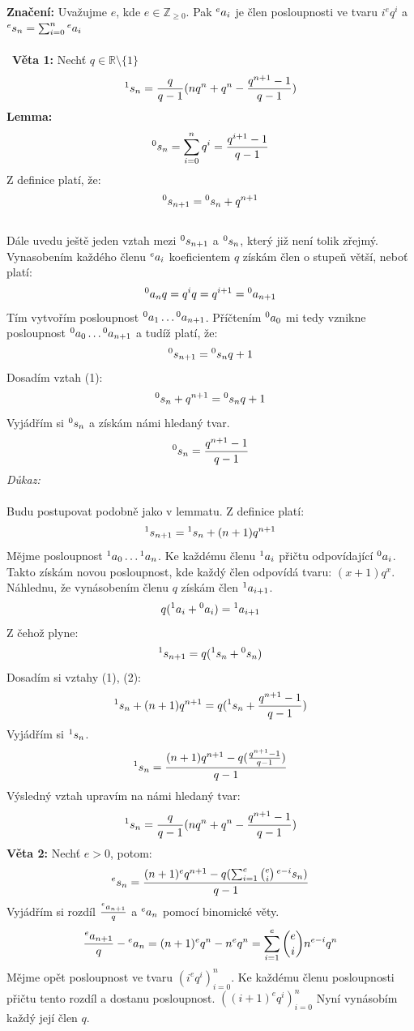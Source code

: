 \documentclass[12pt]{report}			%
\begin{document}
{\bf Značení:} Uvažujme \(e\), kde \(e \in \mathbb{Z}_{\geq 0}\). Pak \(\prescript{e}{}{a_i}\) je člen posloupnosti ve tvaru \(i^eq^i\) a  \(\prescript{e}{}{s_n} = \sum_{i = 0}^{n} \prescript{e}{}{a_i}\)\\\\\
{\bf Věta 1:} Nechť \(q \in \mathbb{R}\setminus\{1\}\) \[\prescript{1}{}{s_n} = \frac{q}{q - 1}(nq^{n}+q^{n} - \frac{q^{n+1}-1}{q-1})  \]
{\bf Lemma:} \[\prescript{0}{}{s_n} = \sum_{i=0}^{n} q^{i}=\frac{q^{i+1} - 1}{q - 1}\]
Z definice platí, že: \begin{equation} \prescript{0}{}{s_{n+1}} = \prescript{0}{}{s_{n}} + q^{n+1}\end{equation}\\Dále uvedu ještě jeden vztah mezi \(\prescript{0}{}{s_{n+1}}\) a \(\prescript{0}{}{s_{n}}\), který již není tolik zřejmý. Vynasobením každého členu \(\prescript{e}{}{a_i}\) koeficientem \(q\) získám člen o stupeň větší, neboť platí:
\[\prescript{0}{}{a_{n}}q=q^iq=q^{i+1}=\prescript{0}{}{a_{n+1}}\]Tím vytvořím posloupnost \(\prescript{0}{}{a_{1}}\dots\prescript{0}{}{a_{n+1}}\). Příčtením \(\prescript{0}{}{a_0}\) mi tedy vznikne posloupnost \(\prescript{0}{}
{a_0}\dots\prescript{0}{}{a_{n+1}}\)
a tudíž platí, že:
\[\prescript{0}{}{s_{n+1}} = \prescript{0}{}{s_{n}}q + 1\]
Dosadím vztah (1):
\[\prescript{0}{}{s_n} + q^{n+1} = \prescript{0}{}{s_{n}}q + 1\]
Vyjádřím si \(\prescript{0}{}{s_n}\) a získám námi hledaný tvar.
\[\prescript{0}{}{s_{n}} =\frac{q^{n+1} - 1}{q - 1}\]
{\it Důkaz:}\\\\Budu postupovat podobně jako v lemmatu. Z definice platí: \begin{equation} \prescript{1}{}{s_{n+1}} = \prescript{1}{}{s_{n}} + (n+1) q^{n+1}\end{equation}
Mějme posloupnost \(\prescript{1}{}{a_{0}}\dots\prescript{1}{}{a_{n}}\).
Ke každému členu \(\prescript{1}{}{a_{i}}\) přičtu odpovídající \(\prescript{0}{}{a_{i}}\). Takto získám novou posloupnost, kde každý člen odpovídá tvaru: \((x+1)q^x\). Náhlednu, že vynásobením členu \(q\) získám člen \(\prescript{1}{}{a_{i+1}}\).
\[q(\prescript{1}{}{a_{i}}+\prescript{0}{}{a_{i}})=\prescript{1}{}{a_{i+1}}\]
Z čehož plyne:
\[\prescript{1}{}{s_{n+1}}=q(\prescript{1}{}{s_{n}} + \prescript{0}{}{s_{n}})\]
Dosadím si vztahy (1), (2):
\[\prescript{1}{}{s_{n}} + (n+1) q^{n+1}=q(\prescript{1}{}{s_{n}} + \frac{q^{n+1} - 1}{q - 1})\]
Vyjádřím si \(\prescript{1}{}{s_{n}}\).
\[\prescript{1}{}{s_{n}}=\frac{(n+1) q^{n+1} - q(\frac{q^{n+1} - 1}{q - 1} )}{q - 1}\]
Výsledný vztah upravím na námi hledaný tvar:
\[\prescript{1}{}{s_n} = \frac{q}{q - 1}(nq^{n}+q^{n} - \frac{q^{n+1}-1}{q-1})  \]
{\bf Věta 2:}
Nechť \(e > 0\), potom:
\[\prescript{e}{}{s_{n}} = \frac{(n+1)^eq^{n+1} - q(\sum_{i=1}^{e}{e \choose i}\prescript{e-i}{}{s_{n}})}{q-1}\]
Vyjádřím si rozdíl \(\frac{\prescript{e}{}{a_{n+1}}}{q}\) a \(\prescript{e}{}{a_{n}}\) pomocí binomické věty.
\[\frac{\prescript{e}{}{a_{n+1}}}{q} -\prescript{e}{}{a_{n}}=(n+1)^eq^n - n^eq^n =\sum_{i=1}^{e}{e \choose i}n^{e - i}q^n\]
Mějme opět posloupnost ve tvaru \((i^eq^i)_{i=0}^n\). Ke každému členu posloupnosti přičtu tento rozdíl a dostanu posloupnost. \(((i+1)^eq^i)_{i=0}^n\) Nyní vynásobím každý její člen \(q\).
\end{document}
